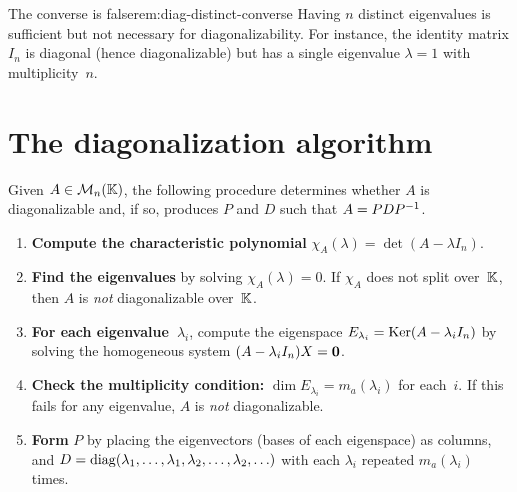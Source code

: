 \begin{remark}{The converse is false}{rem:diag-distinct-converse}
Having $n$ distinct eigenvalues is sufficient but not necessary for
diagonalizability.  For instance, the identity matrix $I_n$ is
diagonal (hence diagonalizable) but has a single eigenvalue
$\lambda = 1$ with multiplicity~$n$.
\end{remark}


\section{The diagonalization algorithm}\label{sec:diag-algorithm}

Given $A\in\mathcal{M}_n({\mathbb{K}})$, the following procedure determines whether
$A$ is diagonalizable and, if so, produces $P$ and $D$ such that
$A = P D {P}^{-1}$.

\begin{enumerate}[label=\textbf{Step \arabic*.}]
  \item \textbf{Compute the characteristic polynomial}
    $\chi_A(\lambda) = \det(A - \lambda I_n)$.
  \item \textbf{Find the eigenvalues} by solving $\chi_A(\lambda) = 0$.
    If $\chi_A$ does not split over~${\mathbb{K}}$, then $A$ is \emph{not}
    diagonalizable over~${\mathbb{K}}$.
  \item \textbf{For each eigenvalue~$\lambda_i$}, compute the eigenspace
    $E_{\lambda_i} = \operatorname{Ker}(A - \lambda_i I_n)$ by solving the
    homogeneous system $(A - \lambda_i I_n)X = \mathbf{0}$.
  \item \textbf{Check the multiplicity condition:}
    $\dim E_{\lambda_i} = m_a(\lambda_i)$ for each~$i$.
    If this fails for any eigenvalue, $A$ is \emph{not} diagonalizable.
  \item \textbf{Form} $P$ by placing the eigenvectors (bases of each
    eigenspace) as columns, and $D = \operatorname{diag}(\lambda_1,\ldots,\lambda_1,
    \lambda_2,\ldots,\lambda_2,\ldots)$ with each $\lambda_i$ repeated
    $m_a(\lambda_i)$ times.
\end{enumerate}

